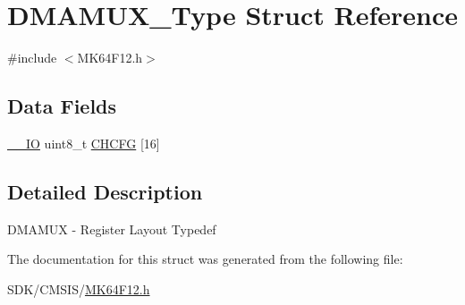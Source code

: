 \hypertarget{struct_d_m_a_m_u_x___type}{}\section{D\+M\+A\+M\+U\+X\+\_\+\+Type Struct Reference}
\label{struct_d_m_a_m_u_x___type}


{\ttfamily \#include $<$M\+K64\+F12.\+h$>$}

\subsection*{Data Fields}
\begin{DoxyCompactItemize}
\item 
\mbox{\hyperlink{core__cm4_8h_aec43007d9998a0a0e01faede4133d6be}{\+\_\+\+\_\+\+IO}} uint8\+\_\+t \mbox{\hyperlink{group___v_r_e_f___peripheral___access___layer_gaeaae1065e5ae88272eaa568f53ebc081}{C\+H\+C\+FG}} \mbox{[}16\mbox{]}
\end{DoxyCompactItemize}


\subsection{Detailed Description}
D\+M\+A\+M\+UX -\/ Register Layout Typedef 

The documentation for this struct was generated from the following file\+:\begin{DoxyCompactItemize}
\item 
S\+D\+K/\+C\+M\+S\+I\+S/\mbox{\hyperlink{_m_k64_f12_8h}{M\+K64\+F12.\+h}}\end{DoxyCompactItemize}
